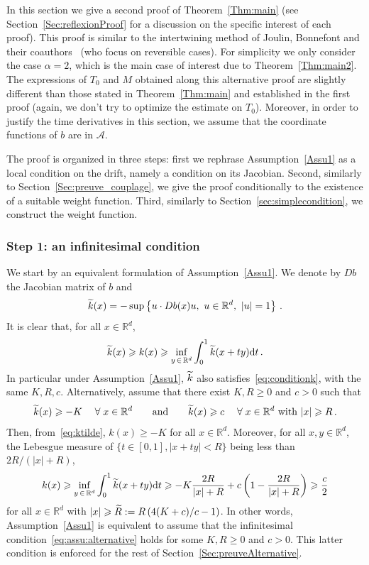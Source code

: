\documentclass[10pt]{amsart}
\theoremstyle{definition}\newtheorem{defi}[theo]{Definition}\newtheorem{rema}[theo]{Remark}\newtheorem{exam}[theo]{Example}\newtheorem{exem}[theo]{Example}\newtheorem{nota}[theo]{Notation}
\newcommand{\R}{\mathbb R}
\newcommand{\A}{\mathcal A}
\newcommand{\dd}{\mathrm{d}}
\newcommand{\1}{\mathbbm{1}}
\newcommand{\nv}[1]{#1}
\let\oldtilde\tilde
\renewcommand*{\tilde}[1]{\mathchoice{\widetilde{#1}}{\widetilde{#1}}{\oldtilde{#1}}{\oldtilde{#1}}}
\let\oldforall\forall
\renewcommand*{\forall}{\mathrel{\oldforall}}
\begin{document}
In this section we give a second proof of Theorem~\ref{Thm:main} (see Section~\ref{Sec:reflexionProof} for a discussion on the specific interest of each proof). \nv{This proof is similar to the intertwining method of Joulin, Bonnefont and their coauthors~\cite{arnaudon2018intertwinings,bonnefont2022note,BonnefontJoulinMa,10.3150/12-BEJ433} (who focus on reversible cases). } For simplicity we only consider the case $\alpha=2$, which is the main case of interest due to Theorem~\ref{Thm:main2}. The expressions of $T_0$ and $M$ obtained along this alternative proof are slightly different than those stated in Theorem~\ref{Thm:main} and established in the first proof (again, we don't try to optimize the estimate on $T_0$). Moreover, in order to justify the time \nv{derivatives} in this section, we assume that the coordinate
\nv{functions} of $b$ are in $\A$.

The proof is organized in three steps: first we rephrase Assumption~\ref{Assu1} as a local condition on the drift, namely a condition on its Jacobian. Second, similarly to Section~\ref{Sec:preuve_couplage}, we give the proof conditionally to the existence of a suitable weight function. Third, similarly to Section~\ref{sec:simplecondition}, we construct the weight function.


\subsubsection{Step 1: \nv{an infinitesimal condition}} \label{sec:localCondition}

We start by an equivalent formulation of Assumption~\ref{Assu1}. We denote by $\nv{D b}$ the Jacobian matrix of $b$ and
\[
\tilde k(x) = -\sup\left\{ u\cdot \nv{D b}(x) u,\ u\in\R^d,\ |u|=1\right\}\,.
\]
It is clear that, for all $x\in\R^d$,
\begin{equation}\label{eq:ktilde}
\tilde k(x) \geqslant k(x) \geqslant \inf_{y\,\in\,\R^d} \int_{0}^1 \tilde k(x+ty) \dd t\,.
\end{equation}
In particular under Assumption~\ref{Assu1}, $\tilde k$ also satisfies~\eqref{eq:conditionk}, with the same $K,R,c$. Alternatively, assume that there exist $K,R\geqslant 0$ and $c>0$ such that
\begin{equation}\label{eq:assu:alternative}
\tilde k(x) \geqslant -K\quad \forall x\in\R^d \qquad \text{and}\qquad \tilde k(x) \geqslant c \quad \forall x\in\R^d\text{ with }|x|\geqslant R\,.
\end{equation}
Then, from~\eqref{eq:ktilde}, $k(x) \geqslant - K$ for all $x\in\R^d$. Moreover, for all $x,y\in\R^d$, the Lebesgue measure of $\{t\in[0,1], |x+ty|<R\}$ being less than $2R/(|x|+R)$,
\[
k(x) \geqslant \inf_{y\,\in\,\R^d} \int_{0}^1 \tilde k(x+ty) \dd t \geqslant -K \frac{2R}{|x|+R} + c \left( 1 - \frac{2R}{|x|+R}\right) \geqslant \frac{c}2
\]
for all $x\in \R^d$ with $|x|\geqslant \tilde R:= R\left( 4(K+c)/c-1\right)$. In other words, Assumption~\ref{Assu1} is equivalent to assume that \nv{the infinitesimal condition}~\eqref{eq:assu:alternative} holds for some $K,R\geqslant 0$ and $c>0$. This latter condition is enforced for the rest of Section~\ref{Sec:preuveAlternative}.
\end{document}
